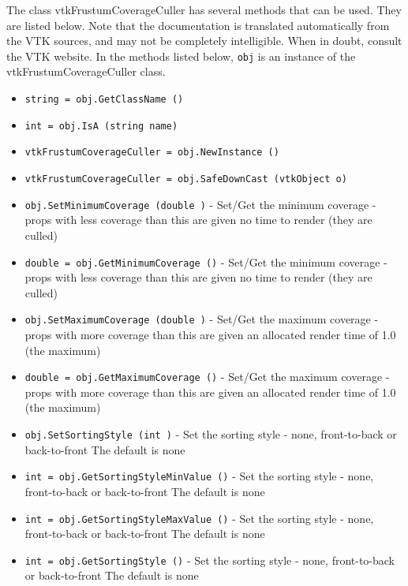 The class vtkFrustumCoverageCuller has several methods that can be used.
  They are listed below.
Note that the documentation is translated automatically from the VTK sources,
and may not be completely intelligible.  When in doubt, consult the VTK website.
In the methods listed below, \verb|obj| is an instance of the vtkFrustumCoverageCuller class.
\begin{itemize}
\item  \verb|string = obj.GetClassName ()|

\item  \verb|int = obj.IsA (string name)|

\item  \verb|vtkFrustumCoverageCuller = obj.NewInstance ()|

\item  \verb|vtkFrustumCoverageCuller = obj.SafeDownCast (vtkObject o)|

\item  \verb|obj.SetMinimumCoverage (double )| -  Set/Get the minimum coverage - props with less coverage than this
 are given no time to render (they are culled)

\item  \verb|double = obj.GetMinimumCoverage ()| -  Set/Get the minimum coverage - props with less coverage than this
 are given no time to render (they are culled)

\item  \verb|obj.SetMaximumCoverage (double )| -  Set/Get the maximum coverage - props with more coverage than this are
 given an allocated render time of 1.0 (the maximum)

\item  \verb|double = obj.GetMaximumCoverage ()| -  Set/Get the maximum coverage - props with more coverage than this are
 given an allocated render time of 1.0 (the maximum)

\item  \verb|obj.SetSortingStyle (int )| -  Set the sorting style - none, front-to-back or back-to-front
 The default is none

\item  \verb|int = obj.GetSortingStyleMinValue ()| -  Set the sorting style - none, front-to-back or back-to-front
 The default is none

\item  \verb|int = obj.GetSortingStyleMaxValue ()| -  Set the sorting style - none, front-to-back or back-to-front
 The default is none

\item  \verb|int = obj.GetSortingStyle ()| -  Set the sorting style - none, front-to-back or back-to-front
 The default is none


\end{itemize}

